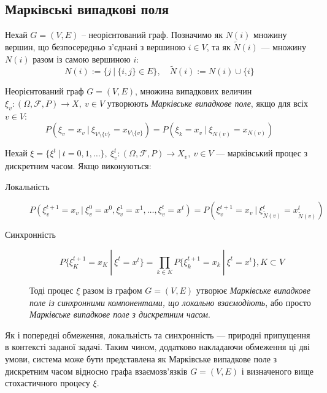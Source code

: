 \documentclass[oneside,draft,14pt]{extarticle}
\begin{document}

\subsection{Марківські випадкові поля}
Нехай \(G = (V, E)\) – неорієнтований граф. Позначимо як \(N(i)\) множину вершин, що безпосередньо з’єднані з вершиною \(i \in V\), та як \(\tilde{N}(i)\) — множину \(N(i)\) разом із самою вершиною \(i\):
\[N(i) := \{j\ |\ \{i, j\} \in E\},\quad\tilde{N}(i) := N(i) \cup \{i\}\]
\begin{definition}
Неорієнтований граф \(G = (V, E)\), множина випадкових величин \(\xi_v : (\Omega, \mathcal{F}, P) \rightarrow X,\ v \in V\) утворюють \textit{Марківське випадкове поле}, якщо для всіх \(v \in V\):
\[P(\xi_v = x_v\ |\ \xi_{V\setminus\{v\}} = x_{V\setminus\{v\}}) = P(\xi_k = x_v\ |\ \xi_{N(v)} = x_{N(v)})\]
\end{definition}

\begin{definition}
Нехай \(\xi = \{\xi^t\ |\ t=0,1,\ldots\},\ \xi^t_v : (\Omega, \mathcal{F}, P) \rightarrow X_v,\ v \in V \) — марківський процес з дискретним часом. 
Якщо виконуються:
\begin{description}
	\item[Локальність] \[P(\xi_v^{t+1} = x_v\ |\ \xi_v^0 = x^0, \xi_v^1 = x^1, \ldots, \xi_v^t = x^t) = P(\xi_v^{t+1} = x_v\ |\ \xi_{\tilde N(v)}^t = x_{\tilde N(v)}^t )\]
	\item[Синхронність] \[P\{\xi^{t+1}_K = x_K\ |\ \xi^t = x^t\} = \prod_{k \in K} P\{\xi^{t+1}_k = x_k\ |\ \xi^t = x^t\}, K \subset V\]
	
Тоді процес \(\xi\) разом із графом \(G = (V, E)\) утворює \textit{Марківське випадкове поле із синхронними компонентами, що локально взаємодіють}, або просто \textit{Марківське випадкове поле з дискретним часом}.
\end{description}
\end{definition}

\vspace{0.5mm}

Як і попередні обмеження, локальність та синхронність — природні припущення в контексті заданої задачі. Таким чином, додатково накладаючи обмеження ці дві умови, система може бути представлена як Марківське випадкове поле з дискретним часом відносно графа взаємозв’язків \(G = (V, E)\) і визначеного вище стохастичного процесу \(\xi\).


\clearpage

\nocite{David:1998}
\nocite{Knopov:2011}
\nocite{Knopov:1998}
\nocite{Chornei:2005}
\nocite{Koller:2009}



\end{document}
